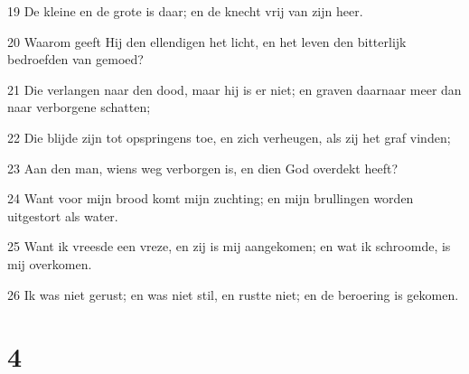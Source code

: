 \par 19 De kleine en de grote is daar; en de knecht vrij van zijn heer.
\par 20 Waarom geeft Hij den ellendigen het licht, en het leven den bitterlijk bedroefden van gemoed?
\par 21 Die verlangen naar den dood, maar hij is er niet; en graven daarnaar meer dan naar verborgene schatten;
\par 22 Die blijde zijn tot opspringens toe, en zich verheugen, als zij het graf vinden;
\par 23 Aan den man, wiens weg verborgen is, en dien God overdekt heeft?
\par 24 Want voor mijn brood komt mijn zuchting; en mijn brullingen worden uitgestort als water.
\par 25 Want ik vreesde een vreze, en zij is mij aangekomen; en wat ik schroomde, is mij overkomen.
\par 26 Ik was niet gerust; en was niet stil, en rustte niet; en de beroering is gekomen.

\chapter{4}

